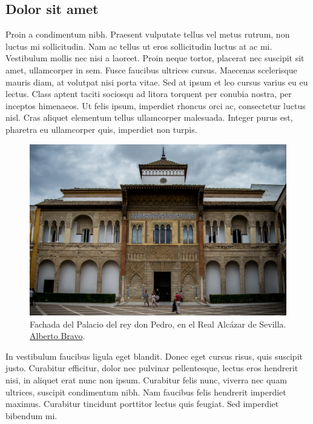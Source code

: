 \subsection{Dolor sit amet}

Proin a condimentum nibh. Praesent vulputate tellus vel metus rutrum, non luctus mi sollicitudin. Nam ac tellus ut eros sollicitudin luctus at ac mi. Vestibulum mollis nec nisi a laoreet. Proin neque tortor, placerat nec suscipit sit amet, ullamcorper in sem. Fusce faucibus ultrices cursus. Maecenas scelerisque mauris diam, at volutpat nisi porta vitae. Sed at ipsum et leo cursus varius eu eu lectus. Class aptent taciti sociosqu ad litora torquent per conubia nostra, per inceptos himenaeos. Ut felis ipsum, imperdiet rhoncus orci ac, consectetur luctus nisl. Cras aliquet elementum tellus ullamcorper malesuada. Integer purus est, pharetra eu ullamcorper quis, imperdiet non turpis.


\begin{figure}
    \centering
    \includegraphics[width=\linewidth]{figures/examples/palacio_del_rey_don_pedro.jpg}
    \caption{Fachada del Palacio del rey don Pedro, en el Real Alcázar de Sevilla. \href{https://commons.wikimedia.org/wiki/File:Fachada_del_Palacio_del_rey_don_Pedro.jpg}{Alberto Bravo}.}
    \label{fig:cha1:donpedro}
\end{figure}





In vestibulum faucibus ligula eget blandit. Donec eget cursus risus, quis suscipit justo. Curabitur efficitur, dolor nec pulvinar pellentesque, lectus eros hendrerit nisi, in aliquet erat nunc non ipsum. Curabitur felis nunc, viverra nec quam ultrices, suscipit condimentum nibh. Nam faucibus felis hendrerit imperdiet maximus. Curabitur tincidunt porttitor lectus quis feugiat. Sed imperdiet bibendum mi.


